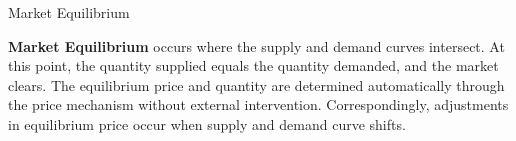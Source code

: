 \documentclass[10pt]{article}
\begin{document}
  \begin{core}{Market Equilibrium}

    \textbf{Market Equilibrium} occurs where the supply and demand curves intersect. At this point, the quantity supplied equals the quantity demanded, and the market clears. The equilibrium price and quantity are determined automatically through the price mechanism without external intervention. Correspondingly, adjustments in equilibrium price occur when supply and demand curve shifts.


  \end{core}
\end{document}
